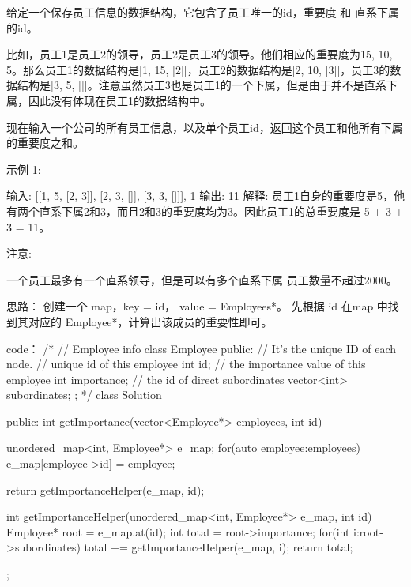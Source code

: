 给定一个保存员工信息的数据结构，它包含了员工唯一的id，重要度 和 直系下属的id。

比如，员工1是员工2的领导，员工2是员工3的领导。他们相应的重要度为15, 10, 5。那么员工1的数据结构是[1, 15, [2]]，员工2的数据结构是[2, 10, [3]]，员工3的数据结构是[3, 5, []]。注意虽然员工3也是员工1的一个下属，但是由于并不是直系下属，因此没有体现在员工1的数据结构中。

现在输入一个公司的所有员工信息，以及单个员工id，返回这个员工和他所有下属的重要度之和。

示例 1:

输入: [[1, 5, [2, 3]], [2, 3, []], [3, 3, []]], 1
输出: 11
解释:
员工1自身的重要度是5，他有两个直系下属2和3，而且2和3的重要度均为3。因此员工1的总重要度是 5 + 3 + 3 = 11。

注意:

    一个员工最多有一个直系领导，但是可以有多个直系下属
    员工数量不超过2000。




























思路：
创建一个 map，key = id， value = Employees*。
先根据 id 在map 中找到其对应的 Employee*，计算出该成员的重要性即可。


























code：
/*
// Employee info
class Employee {
public:
    // It's the unique ID of each node.
    // unique id of this employee
    int id;
    // the importance value of this employee
    int importance;
    // the id of direct subordinates
    vector<int> subordinates;
};
*/
class Solution {
public:
    int getImportance(vector<Employee*> employees, int id) {
        unordered_map<int, Employee*> e_map;
        for(auto employee:employees)
            e_map[employee->id] = employee;
        
        return getImportanceHelper(e_map, id);
    }
    int getImportanceHelper(unordered_map<int, Employee*> e_map, int id)
    {
        Employee* root = e_map.at(id);
        int total = root->importance;
        for(int i:root->subordinates)
            total += getImportanceHelper(e_map, i);
        return total;
    }
};
